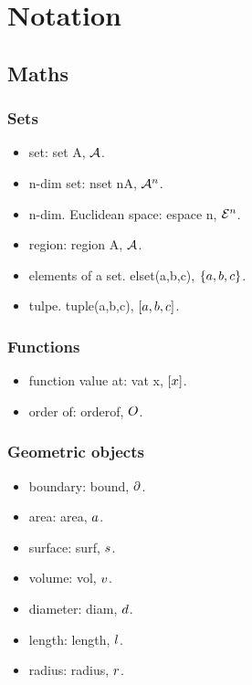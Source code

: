 \section{Notation}

\subsection{Maths}

\subsubsection{Sets}
\begin{itemize}
\item set: set A, $\set A$.
\item n-dim set: nset nA, $\nset nA$.
\item n-dim. Euclidean space: espace n, $\espace n$.
\item region: region A, $\region A$.
\item elements of a set. elset(a,b,c), $\elset{a,b,c}$.
\item tulpe. tuple(a,b,c), $\tuple{a,b,c}$.
\end{itemize}


\subsubsection{Functions}
\begin{itemize}
\item function value at: vat x, $\vat x$.
\item order of: orderof, $\orderof$.
\end{itemize}


\subsubsection{Geometric objects}
\begin{itemize}
\item boundary: bound, $\bound$.
\item area: area, $\area$.
\item surface: surf, $\surf$.
\item volume: vol, $\vol$.
\item diameter: diam, $\diam$.
\item length: length, $\length$.
\item radius: radius, $\radius$.
\end{itemize}


